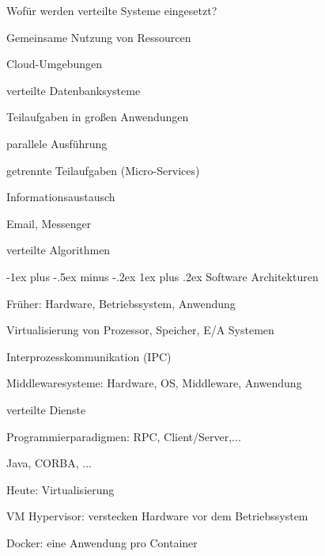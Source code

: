 \documentclass[10pt]{article}
\makeatletter
\renewcommand{\subsubsection}{\@startsection{subsubsection}{3}{0mm}%
                                {-1ex plus -.5ex minus -.2ex}%
                                {1ex plus .2ex}%
                                {\normalfont\small\bfseries}}
\makeatother
\begin{document}
  Wofür werden verteilte Systeme eingesetzt? 
  \begin{itemize*}
    \item Gemeinsame Nutzung von Ressourcen
    \begin{itemize*}
      \item Cloud-Umgebungen
      \item verteilte Datenbanksysteme
    \end{itemize*}
    \item Teilaufgaben in großen Anwendungen
    \begin{itemize*}
      \item parallele Ausführung
      \item getrennte Teilaufgaben (Micro-Services)
    \end{itemize*}
    \item Informationsaustausch
    \begin{itemize*}
      \item Email, Messenger
      \item verteilte Algorithmen
    \end{itemize*}
  \end{itemize*}
  
  \subsubsection{Software Architekturen}
  \begin{enumerate*}
    \item Früher: Hardware, Betriebssystem, Anwendung
    \begin{itemize*}
      \item Virtualisierung von Prozessor, Speicher, E/A Systemen
      \item Interprozesskommunikation (IPC)
    \end{itemize*}
    \item Middlewaresysteme: Hardware, OS, Middleware, Anwendung
    \begin{itemize*}
      \item verteilte Dienste
      \item Programmierparadigmen: RPC, Client/Server,...
      \item Java, CORBA, ...
    \end{itemize*}
    \item Heute: Virtualisierung
    \begin{itemize*}
      \item VM Hypervisor: verstecken Hardware vor dem Betriebssystem
      \item Docker: eine Anwendung pro Container
    \end{itemize*}
  \end{enumerate*}
  
\end{document}
